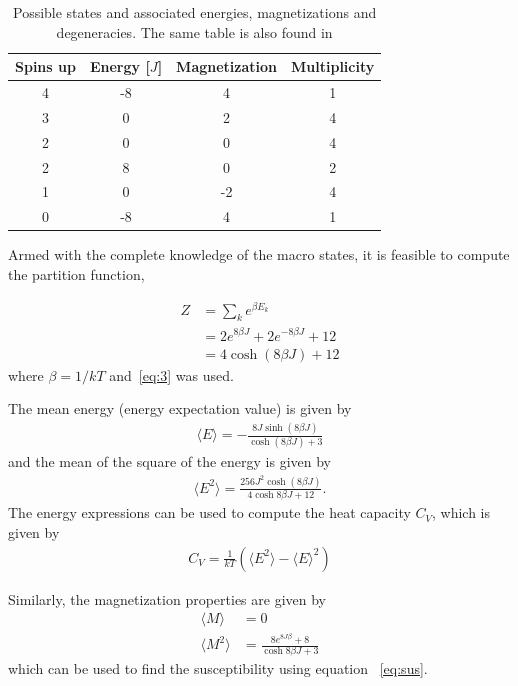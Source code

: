 \documentclass[aps,reprint]{revtex4-1}
\newcommand{\mean}[1]{\langle #1 \rangle}
\begin{document}
\begin{table}[H]
  \caption{Possible states and associated energies, magnetizations and degeneracies.
  The same table is also found in \cite{mortenjensen}}
  \label{tab:2x2values}
    \begin{tabular}{cccc}
      Spins up & Energy [$J$] & Magnetization & Multiplicity \\\hline
      4        & -8           & 4             & 1            \\
      3        & 0            & 2             & 4            \\
      2        & 0            & 0             & 4            \\
      2        & 8            & 0             & 2            \\
      1        & 0            & -2            & 4            \\
      0        & -8           & 4             & 1
    \end{tabular}
\end{table}

Armed with the complete knowledge of the macro states, it is feasible to compute
the partition function,

\begin{align*} \label{eq:partitionfunc}
  Z &= \sum_k e^{\beta E_k}\\
    &= 2 e^{8\beta J} + 2 e^{- 8\beta J} + 12\\
  &= 4 \cosh{(8\beta J)} + 12
\end{align*}
where \(\beta = 1/kT\) and~\eqref{eq:3} was used.


The mean energy (energy expectation value) is given by
\begin{align*}
  \mean{E} = -\frac{8 J \sinh{(8\beta J)}}{\cosh{(8\beta J)} + 3}
\end{align*}
and the mean of the square of the energy is given by
\begin{align*}
  \mean{E^2} = \frac{256 J^2 \cosh{(8\beta J)}}{4\cosh{8\beta J} + 12}.
\end{align*}
The energy expressions can be used to compute the heat capacity $C_V$, which
is given by
\begin{align*}
  C_V = \frac{1}{kT} \left( \mean{E^2} - \mean{E}^2 \right)
\end{align*}

Similarly, the magnetization properties are given by
\begin{align*}
  \mean{M} &= 0 \\
  \mean{M^2} &= \frac{8e^{8 J \beta} + 8}{\cosh{8\beta J} + 3}
\end{align*}
which can be used to find the susceptibility using equation ~\ref{eq:sus}.
\end{document}
